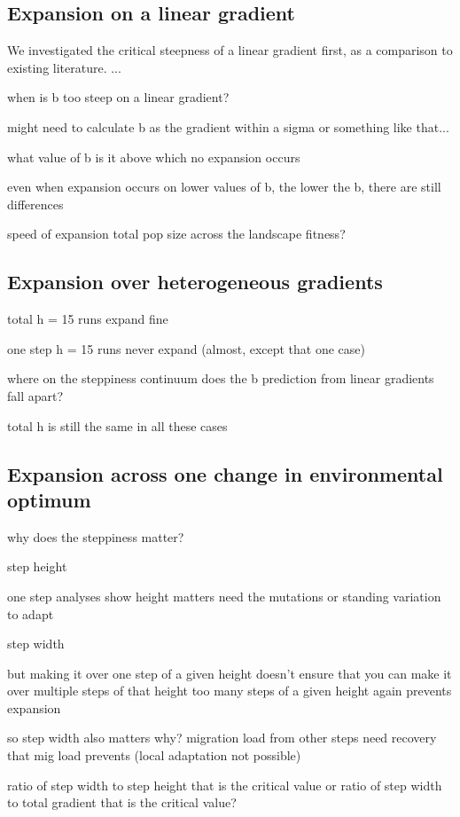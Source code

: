 \subsection{Expansion on a linear gradient}

We investigated the critical steepness of a linear gradient first, as a comparison to existing literature.
...

when is b too steep on a linear gradient?

	might need to calculate b as the gradient within a sigma or something like that...

what value of b is it above which no expansion occurs

even when expansion occurs on lower values of b, the lower the b, there are still differences

speed of expansion
total pop size across the landscape
fitness?

\subsection{Expansion over heterogeneous gradients}

total h = 15 runs expand fine

one step h = 15 runs never expand (almost, except that one case)

where on the steppiness continuum does the b prediction from linear gradients fall apart?

total h is still the same in all these cases

\subsection{Expansion across one change in environmental optimum}

why does the steppiness matter?

step height

	one step analyses show height matters
	need the mutations or standing variation to adapt


step width

	but making it over one step of a given height doesn't ensure that you can make it over multiple steps of that height
	too many steps of a given height again prevents expansion
	
	so step width also matters
		why?
		migration load from other steps
		need recovery that mig load prevents (local adaptation not possible)
		
		ratio of step width to step height that is the critical value
		or ratio of step width to total gradient that is the critical value?

